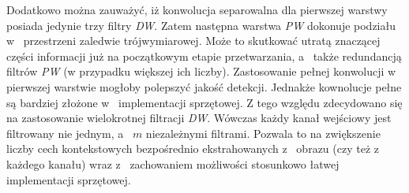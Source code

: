 Dodatkowo można zauważyć, iż konwolucja separowalna dla pierwszej warstwy posiada jedynie trzy filtry \emph{DW}.
Zatem następna warstwa \emph{PW} dokonuje podziału w~ przestrzeni zaledwie trójwymiarowej. 
Może to skutkować utratą znaczącej części informacji już na początkowym etapie przetwarzania, a~ także redundancją filtrów \emph{PW} (w przypadku większej ich liczby).
Zastosowanie pełnej konwolucji w~ pierwszej warstwie mogłoby polepszyć jakość detekcji.
Jednakże kownolucje pełne są bardziej złożone w~ implementacji sprzętowej. 
Z tego względu zdecydowano się na zastosowanie wielokrotnej filtracji \emph{DW}.
Wówczas każdy kanał wejściowy jest filtrowany nie jednym, a~ $m$ niezależnymi filtrami.
Pozwala to na zwiększenie liczby cech kontekstowych bezpośrednio ekstrahowanych z~ obrazu (czy też z~ każdego kanału) wraz z~ zachowaniem możliwości stosunkowo łatwej implementacji sprzętowej.

